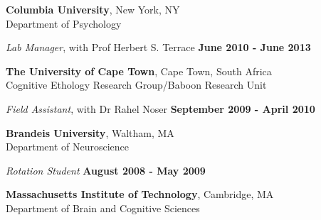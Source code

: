 \documentclass[margin,line]{res}
\begin{document}
\begin{resume}
{\bf Columbia University}, New York, NY \\
Department of Psychology

\vspace{-.2cm}
{\em Lab Manager}, with Prof Herbert S. Terrace \hfill {\bf June 2010 - June 2013}\\
\vspace{-.3cm}


\vspace{-.1cm}

{\bf The University of Cape Town}, Cape Town, South Africa \\
Cognitive Ethology Research Group/Baboon Research Unit

\vspace{-.2cm}
{\em Field Assistant}, with Dr Rahel Noser \hfill {\bf September 2009 - April 2010}\\
\vspace{-.3cm}


\vspace{-.1cm}

{\bf Brandeis University}, Waltham, MA \\
Department of Neuroscience

\vspace{-.2cm}
{\em Rotation Student} \hfill {\bf August 2008 - May 2009}\\
\vspace{-.3cm}


\vspace{-.1cm}

{\bf Massachusetts Institute of Technology}, Cambridge, MA \\
Department of Brain and Cognitive Sciences


\end{resume}
\end{document}
